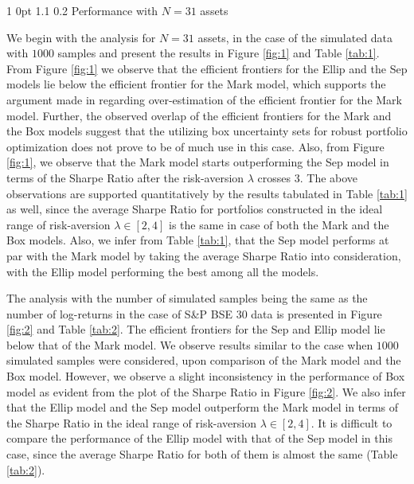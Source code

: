 \documentclass[12pt]{article}
\makeatletter
\numberwithin{equation}{section}
\renewcommand{\subsection}{
  \@startsection
  {subsection}%
  {1}%
  {0pt}%
  {1.1\baselineskip}%
  {0.2\baselineskip}%
  {\sc \centering}%
}
\makeatother
\begin{document}
\subsection{Performance with $N=31$ assets}

We begin with the analysis for $N=31$ assets, in the case of the simulated data with $1000$ samples and present the results in Figure \ref{fig:1} and Table \ref{tab:1}. From Figure \ref{fig:1} we observe that the efficient frontiers for the Ellip and the Sep models lie below the efficient frontier for the Mark model, which  supports the argument made in \cite{Broadie93} regarding over-estimation of the efficient frontier for the Mark model. Further, the observed overlap of the efficient frontiers for the Mark and the Box models suggest that the utilizing box uncertainty sets for robust portfolio optimization does not prove to be of much use in this case. Also, from Figure \ref{fig:1}, we observe that the Mark model starts outperforming the Sep model in terms of the Sharpe Ratio after the risk-aversion $\lambda$ crosses $3$. The above observations are supported quantitatively by the results tabulated in Table \ref{tab:1} as well, since the average Sharpe Ratio for portfolios constructed in the ideal range of risk-aversion $\lambda\in [2,4]$ is the same in case of both the Mark and the Box models. Also, we infer from Table \ref{tab:1}, that the Sep model performs at par with the Mark model by taking the average Sharpe Ratio into consideration, with the Ellip model performing the best among all the models.

The analysis with the number of simulated samples being the same as the number of log-returns in the case of S\&P BSE 30 data is presented in Figure \ref{fig:2} and Table \ref{tab:2}. The efficient frontiers for the Sep and Ellip model lie below that of the Mark model. We observe results similar to the case when $1000$ simulated samples were considered, upon comparison of the Mark model and the Box model. However, we observe a slight inconsistency in the performance of Box model as evident from the plot of the Sharpe Ratio in Figure \ref{fig:2}.  We also infer that the Ellip model and the Sep model outperform the Mark model in terms of the Sharpe Ratio in the ideal range of risk-aversion $\lambda \in [2,4]$. It is difficult to compare the performance of the Ellip model with that of the Sep model in this case, since the average Sharpe Ratio for both of them is almost the same (Table \ref{tab:2}).
\end{document}
